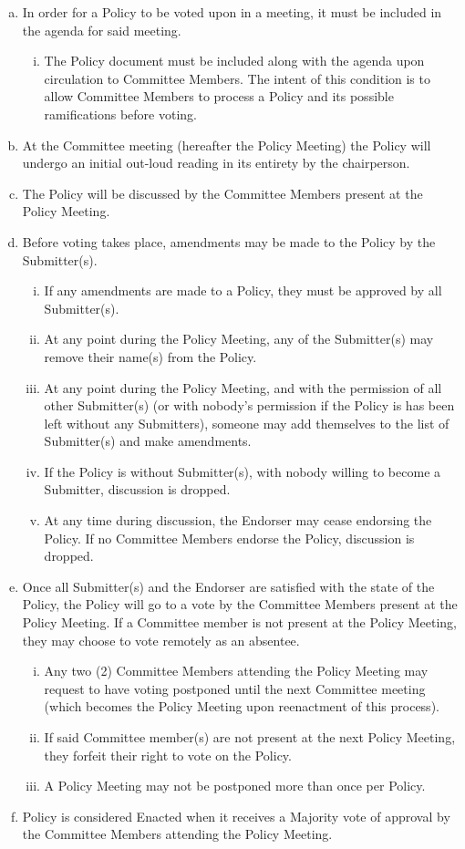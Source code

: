 \documentclass[a4paper,12pt]{article}
\begin{document}
\begin{enumerate}[a)]
	\item In order for a Policy to be voted upon in a meeting, it must be included in the agenda for said meeting.
	\begin{enumerate}[i)]
		\item The Policy document must be included along with the agenda upon circulation to Committee Members. The intent of this condition is to allow Committee Members to process a Policy and its possible ramifications before voting.
	\end{enumerate}
	\item At the Committee meeting (hereafter the Policy Meeting) the Policy will undergo an initial out-loud reading in its entirety by the chairperson.
	\item The Policy will be discussed by the Committee Members present at the Policy Meeting.
	\item Before voting takes place, amendments may be made to the Policy by the Submitter(s).
	\begin{enumerate}[i)]
		\item If any amendments are made to a Policy, they must be approved by all Submitter(s).
		\item At any point during the Policy Meeting, any of the Submitter(s) may remove their name(s) from the Policy.
		\item At any point during the Policy Meeting, and with the permission of all other Submitter(s) (or with nobody's permission if the Policy is has been left without any Submitters), someone may add themselves to the list of Submitter(s) and make amendments.
		\item If the Policy is without Submitter(s), with nobody willing to become a Submitter, discussion is dropped.
		\item At any time during discussion, the Endorser may cease endorsing the Policy. If no Committee Members endorse the Policy, discussion is dropped.
	\end{enumerate}
	\item Once all Submitter(s) and the Endorser are satisfied with the state of the Policy, the Policy will go to a vote by the Committee Members present at the Policy Meeting. If a Committee member is not present at the Policy Meeting, they may choose to vote remotely as an absentee.
	\begin{enumerate}[i)]
		\item Any two (2) Committee Members attending the Policy Meeting may request to have voting postponed until the next Committee meeting (which becomes the Policy Meeting upon reenactment of this process).
		\item If said Committee member(s) are not present at the next Policy Meeting, they forfeit their right to vote on the Policy.
		\item A Policy Meeting may not be postponed more than once per Policy.
	\end{enumerate}
	\item Policy is considered Enacted when it receives a Majority vote of approval by the Committee Members attending the Policy Meeting.
\end{enumerate}
\end{document}

